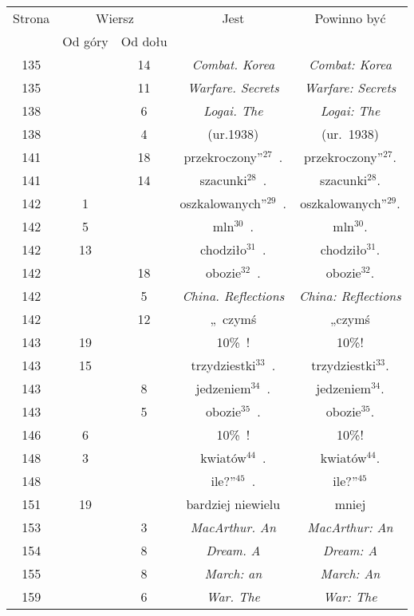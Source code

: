 \documentclass[a4paper,11pt]{article}
\numberwithin{equation}{section}
\begin{document}
\begin{center}
  \begin{tabular}{|c|c|c|c|c|}
    \hline
    Strona & \multicolumn{2}{c|}{Wiersz} & Jest
                              & Powinno być \\ \cline{2-3}
    & Od góry & Od dołu & & \\
    \hline
    135 & & 14 & \textit{Combat. Korea} & \textit{Combat: Korea} \\
    135 & & 11 & \textit{Warfare. Secrets} & \textit{Warfare: Secrets} \\
    138 & &  6 & \textit{Logai. The} & \textit{Logai: The} \\
    138 & &  4 & (ur.1938) & (ur.~1938) \\
    141 & & 18 & przekroczony''$^{ 27 }$~. & przekroczony''$^{ 27 }$. \\
    141 & & 14 & szacunki$^{ 28 }$~. & szacunki$^{ 28 }$. \\
    142 &  1 & & oszkalowanych''$^{ 29 }$~. & oszkalowanych''$^{ 29 }$. \\
    142 &  5 & & mln$^{ 30 }$~. & mln$^{ 30 }$. \\
    142 & 13 & & chodziło$^{ 31 }$~. & chodziło$^{ 31 }$. \\
    142 & & 18 & obozie$^{ 32 }$~. & obozie$^{ 32 }$. \\
    142 & &  5 & \textit{China. Reflections}
           & \textit{China: Reflections} \\
    142 & & 12 & „~czymś & „czymś \\
    143 & 19 & & 10\%~! & 10\%! \\
    143 & 15 & & trzydziestki$^{ 33 }$~. & trzydziestki$^{ 33 }$. \\
    143 & &  8 & jedzeniem$^{ 34 }$~. & jedzeniem$^{ 34 }$. \\
    143 & &  5 & obozie$^{ 35 }$~.  & obozie$^{ 35 }$. \\
    146 &  6 & & 10\%~! & 10\%! \\
    148 &  3 & & kwiatów$^{ 44 }$~. & kwiatów$^{ 44 }$. \\
    148 & & & ile?”$^{ 45 }$~. & ile?”$^{ 45 }$ \\
    151 & 19 & & bardziej niewielu & mniej \\
    153 & &  3 & \textit{MacArthur. An} & \textit{MacArthur: An} \\
    154 & &  8 & \textit{Dream. A} & \textit{Dream: A} \\
    155 & &  8 & \textit{March: an} & \textit{March: An} \\
    159 & &  6 & \textit{War. The} & \textit{War: The} \\

\end{tabular}
\end{center}
\end{document}
